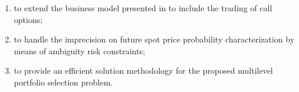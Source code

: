 	\begin{enumerate}
		\item to extend the business model presented in \cite{RobustSpotPrice, AmbiguityEnergySpotPrice} to include the trading of call options;
		\item to handle the imprecision on future spot price probability characterization by means of ambiguity risk constraints;
		\item to provide an efficient solution methodology for the proposed multilevel portfolio selection problem.
	\end{enumerate}


